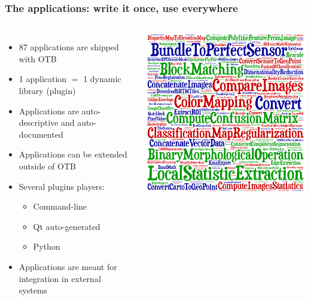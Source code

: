 \documentclass[8pt]{beamer}
\begin{document}
\begin{frame}
\frametitle{The applications: write it once, use everywhere}
\begin{columns}
\begin{itemize}
\item 87 applications are shipped with OTB
\item 1 application $=$ 1 dynamic library (plugin)
\item Applications are auto-descriptive and auto-documented
\item Applications can be extended outside of OTB
\item Several plugins players:
\begin{itemize}
  \item Command-line
  \item Qt auto-generated
  \item Python
\end{itemize}
\item Applications are meant for integration in external systems
\end{itemize}
\includegraphics[width=\textwidth]{images/cloud_applications.png}
\end{columns}
\end{frame}
\end{document}
